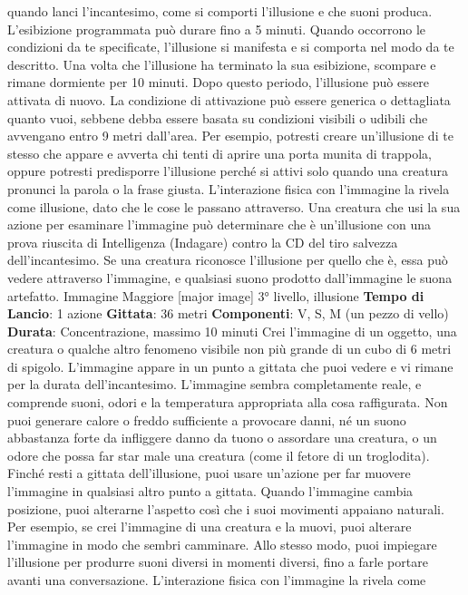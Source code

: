 \begin{multicols}{2}
quando lanci l’incantesimo, come si comporti l’illusione
e che suoni produca. L’esibizione programmata può
durare fino a 5 minuti.
Quando occorrono le condizioni da te specificate,
l’illusione si manifesta e si comporta nel modo da te
descritto. Una volta che l’illusione ha terminato la sua
esibizione, scompare e rimane dormiente per 10 minuti.
Dopo questo periodo, l’illusione può essere attivata di
nuovo.
La condizione di attivazione può essere generica o
dettagliata quanto vuoi, sebbene debba essere basata
su condizioni visibili o udibili che avvengano entro 9
metri dall’area. Per esempio, potresti creare un’illusione
di te stesso che appare e avverta chi tenti di aprire una
porta munita di trappola, oppure potresti predisporre
l’illusione perché si attivi solo quando una creatura
pronunci la parola o la frase giusta.
L’interazione fisica con l’immagine la rivela come
illusione, dato che le cose le passano attraverso. Una
creatura che usi la sua azione per esaminare
l’immagine può determinare che è un’illusione con una
prova riuscita di Intelligenza (Indagare) contro la CD del
tiro salvezza dell’incantesimo. Se una creatura
riconosce l’illusione per quello che è, essa può vedere
attraverso l’immagine, e qualsiasi suono prodotto
dall’immagine le suona artefatto.
Immagine Maggiore
[major image]
3° livello, illusione
\textbf{Tempo di Lancio}: 1 azione
\textbf{Gittata}: 36 metri
\textbf{Componenti}: V, S, M (un pezzo di vello)
\textbf{Durata}: Concentrazione, massimo 10 minuti
Crei l’immagine di un oggetto, una creatura o qualche
altro fenomeno visibile non più grande di un cubo di 6
metri di spigolo. L’immagine appare in un punto a
gittata che puoi vedere e vi rimane per la durata
dell’incantesimo. L’immagine sembra completamente
reale, e comprende suoni, odori e la temperatura
appropriata alla cosa raffigurata. Non puoi generare
calore o freddo sufficiente a provocare danni, né un
suono abbastanza forte da infliggere danno da tuono o
assordare una creatura, o un odore che possa far star
male una creatura (come il fetore di un troglodita).
Finché resti a gittata dell’illusione, puoi usare un’azione
per far muovere l’immagine in qualsiasi altro punto a
gittata. Quando l’immagine cambia posizione, puoi
alterarne l’aspetto così che i suoi movimenti appaiano
naturali. Per esempio, se crei l’immagine di una
creatura e la muovi, puoi alterare l’immagine in modo
che sembri camminare. Allo stesso modo, puoi
impiegare l’illusione per produrre suoni diversi in
momenti diversi, fino a farle portare avanti una
conversazione.
L’interazione fisica con l’immagine la rivela come

\end{multicols}
